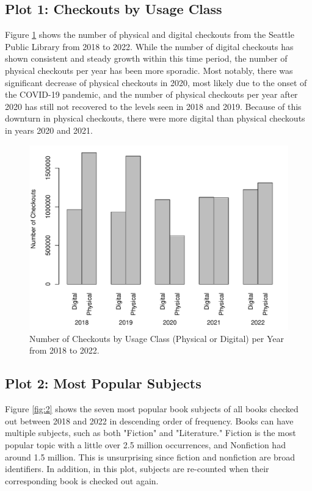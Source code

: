 \documentclass[10pt]{article}\usepackage[]{graphicx}\usepackage[]{color}
\makeatletter
\def\maxwidth{ %
  \ifdim\Gin@nat@width>\linewidth
    \linewidth
  \else
    \Gin@nat@width
  \fi
}
\newenvironment{knitrout}{}{} %
\makeatother
\begin{document}
\subsection{Plot 1: Checkouts by Usage Class}
Figure \ref{fig:1} shows the number of physical and digital checkouts from the Seattle Public Library from 2018 to 2022. While the number of digital checkouts has shown consistent and steady growth within this time period, the number of physical checkouts per year has been more sporadic. Most notably, there was significant decrease of physical checkouts in 2020, most likely due to the onset of the COVID-19 pandemic, and the number of physical checkouts per year after 2020 has still not recovered to the levels seen in 2018 and 2019. Because of this downturn in physical checkouts, there were more digital than physical checkouts in years 2020 and 2021.
\begin{figure}[H]
\begin{center}
\begin{knitrout}
\color{fgcolor}
\includegraphics[width=\maxwidth]{figure/plot1-1} 
\end{knitrout}
  \end{center}
\caption{Number of Checkouts by Usage Class (Physical or Digital) per Year from 2018 to 2022.}\label{fig:1}
\end{figure}

\subsection{Plot 2: Most Popular Subjects}

Figure \ref{fig:2} shows the seven most popular book subjects of all books checked out between 2018 and 2022 in descending order of frequency. Books can have multiple subjects, such as both "Fiction" and "Literature." Fiction is the most popular topic with a little over 2.5 million occurrences, and Nonfiction had around 1.5 million. This is unsurprising since fiction and nonfiction are broad identifiers. In addition, in this plot, subjects are re-counted when their corresponding book is checked out again.
\end{document}
